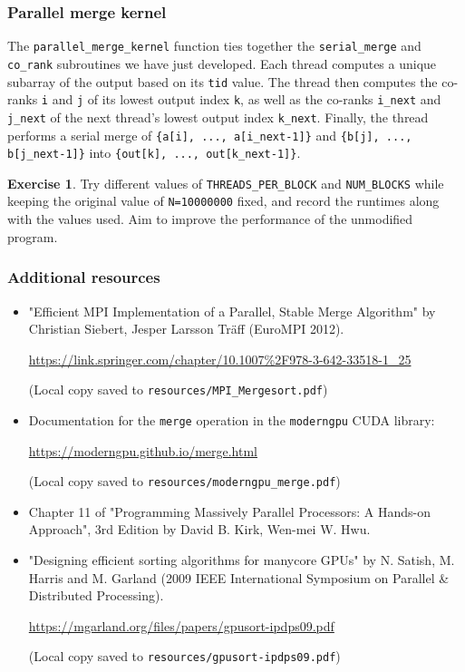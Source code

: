 \documentclass{article}
\newcommand{\resource}[1]{(Local copy saved to \texttt{#1})}
\theoremstyle{definition}
\newtheorem{exercise}{Exercise}
\begin{document}
\subsubsection{Parallel merge kernel}

The \texttt{parallel\_merge\_kernel} function ties together the \texttt{serial\_merge} and \texttt{co\_rank} subroutines we have just developed. Each thread computes a unique subarray of the output based on its \texttt{tid} value. The thread then computes the co-ranks \texttt{i} and \texttt{j} of its lowest output index \texttt{k}, as well as the co-ranks \texttt{i\_next} and \texttt{j\_next} of the next thread's lowest output index \texttt{k\_next}. Finally, the thread performs a serial merge of \texttt{\{a[i], ..., a[i\_next-1]\}} and \texttt{\{b[j], ..., b[j\_next-1]\}} into \texttt{\{out[k], ..., out[k\_next-1]\}}.

\begin{exercise}
Try different values of \texttt{THREADS\_PER\_BLOCK} and \texttt{NUM\_BLOCKS} while keeping the original value of \texttt{N=10000000} fixed, and record the runtimes along with the values used. Aim to improve the performance of the unmodified program.
\end{exercise}

\subsubsection*{Additional resources}
\begin{itemize}
    \item "Efficient MPI Implementation of a Parallel, Stable Merge Algorithm" by Christian Siebert, Jesper Larsson Träff (EuroMPI 2012).
    
    \url{https://link.springer.com/chapter/10.1007%2F978-3-642-33518-1_25}
    
    \resource{resources/MPI\_Mergesort.pdf}

    \item Documentation for the \texttt{merge} operation in the \texttt{moderngpu} CUDA library:
    
    \url{https://moderngpu.github.io/merge.html}
    
    \resource{resources/moderngpu\_merge.pdf}
    
    \item Chapter 11 of "Programming Massively Parallel Processors: A Hands-on Approach", 3rd Edition by David B. Kirk, Wen-mei W. Hwu.
    
    \item  "Designing efficient sorting algorithms for manycore GPUs" by N. Satish, M. Harris and M. Garland (2009 IEEE International Symposium on Parallel \& Distributed Processing).
    
    \url{https://mgarland.org/files/papers/gpusort-ipdps09.pdf}
    
    \resource{resources/gpusort-ipdps09.pdf}
\end{itemize}
\end{document}
